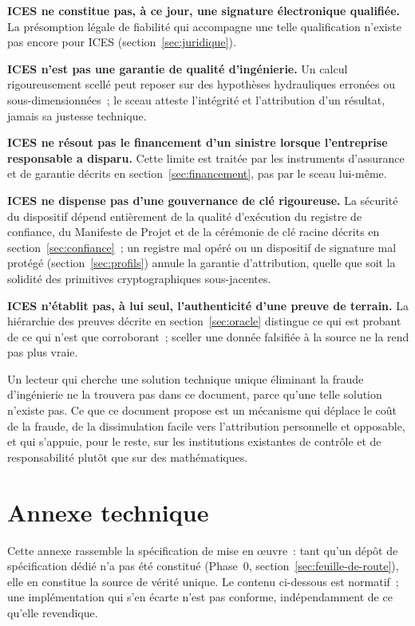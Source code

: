 \documentclass[11pt,a4paper]{article}
\begin{document}
\textbf{ICES ne constitue pas, à ce jour, une signature électronique qualifiée.} La présomption légale de fiabilité qui accompagne une telle qualification n'existe pas encore pour ICES (section~\ref{sec:juridique}).

\textbf{ICES n'est pas une garantie de qualité d'ingénierie.} Un calcul rigoureusement scellé peut reposer sur des hypothèses hydrauliques erronées ou sous-dimensionnées~; le sceau atteste l'intégrité et l'attribution d'un résultat, jamais sa justesse technique.

\textbf{ICES ne résout pas le financement d'un sinistre lorsque l'entreprise responsable a disparu.} Cette limite est traitée par les instruments d'assurance et de garantie décrits en section~\ref{sec:financement}, pas par le sceau lui-même.

\textbf{ICES ne dispense pas d'une gouvernance de clé rigoureuse.} La sécurité du dispositif dépend entièrement de la qualité d'exécution du registre de confiance, du Manifeste de Projet et de la cérémonie de clé racine décrits en section~\ref{sec:confiance}~; un registre mal opéré ou un dispositif de signature mal protégé (section~\ref{sec:profils}) annule la garantie d'attribution, quelle que soit la solidité des primitives cryptographiques sous-jacentes.

\textbf{ICES n'établit pas, à lui seul, l'authenticité d'une preuve de terrain.} La hiérarchie des preuves décrite en section~\ref{sec:oracle} distingue ce qui est probant de ce qui n'est que corroborant~; sceller une donnée falsifiée à la source ne la rend pas plus vraie.

Un lecteur qui cherche une solution technique unique éliminant la fraude d'ingénierie ne la trouvera pas dans ce document, parce qu'une telle solution n'existe pas. Ce que ce document propose est un mécanisme qui déplace le coût de la fraude, de la dissimulation facile vers l'attribution personnelle et opposable, et qui s'appuie, pour le reste, sur les institutions existantes de contrôle et de responsabilité plutôt que sur des mathématiques.

\section{Annexe technique}\label{sec:annexe}

Cette annexe rassemble la spécification de mise en œuvre~: tant qu'un dépôt de spécification dédié n'a pas été constitué (Phase~0, section~\ref{sec:feuille-de-route}), elle en constitue la source de vérité unique. Le contenu ci-dessous est normatif~; une implémentation qui s'en écarte n'est pas conforme, indépendamment de ce qu'elle revendique.
\end{document}
